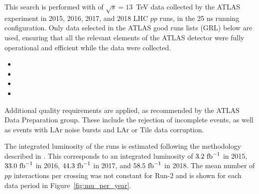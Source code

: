 This search is performed with \lumi of $\sqrt{s} = 13$~TeV data collected by the ATLAS experiment in 2015, 2016, 2017, and 2018 LHC $pp$ runs, in the 25 ns running configuration.
Only data selected in the ATLAS good runs lists (GRL) below are used, ensuring that all the relevant elements of the ATLAS detector were fully operational and efficient while the data were collected.
\begin{itemize}
    \itemsep -1em 
    \item {}
    \item {}
    \item {}
    \item {}
\end{itemize}
Additional quality requirements are applied, as recommended by the ATLAS Data Preparation group. These include the rejection of incomplete events, as well as events with LAr noise bursts and LAr or Tile data corruption.

The integrated luminosity of the runs is estimated following the methodology described in \cite{Aad:2013ucp}.
This corresponds to an integrated luminosity of $3.2~\text{fb}^{-1}$ in 2015, $33.0~\text{fb}^{-1}$ in 2016, $44.3~\text{fb}^{-1}$ in 2017, and $58.5~\text{fb}^{-1}$ in 2018.
The mean number of $pp$ interactions per crossing was not constant for Run-2 and is shown for each data period in Figure~\ref{fig:mu_per_year}.


